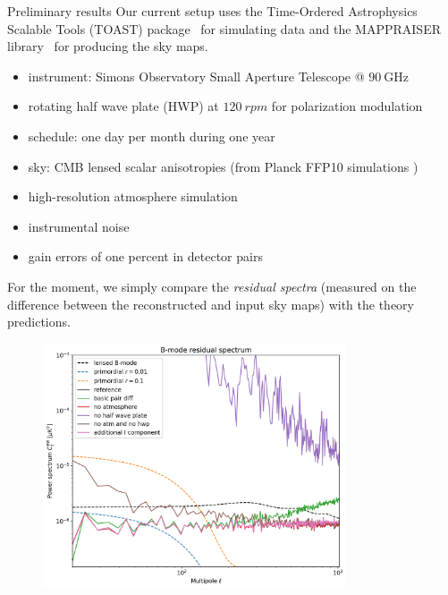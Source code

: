 \documentclass[final]{beamer}
\newlength{\colwidth}
\begin{document}
\begin{frame}[t]
\begin{columns}[t]
\begin{column}{\colwidth}
\begin{block}{Preliminary results}
        Our current setup uses the Time-Ordered Astrophysics Scalable Tools (TOAST) package~\cite{toast} for simulating data and the MAPPRAISER library~\cite{ElBouhargani:2021umq} for producing the sky maps.

        \begin{itemize}
          \item instrument: Simons Observatory Small Aperture Telescope @ $\qty[mode=text]{90}{\giga\hertz}$
          \item rotating half wave plate (HWP) at $\qty[mode=text]{120}{rpm}$ for polarization modulation
          \item schedule: one day per month during one year
          \item sky: CMB lensed scalar anisotropies (from Planck FFP10 simulations \cite{Planck:2018-iii})
          \item high-resolution atmosphere simulation
          \item instrumental noise
          \item gain errors of one percent in detector pairs
        \end{itemize}

        For the moment, we simply compare the \emph{residual spectra} (measured on the difference between the reconstructed and input sky maps) with the theory predictions.

        \begin{figure}
          \centering
          \includegraphics[width=0.8\textwidth]{figures/comparison.png}
        \end{figure}


\end{block}
\end{column}
\end{columns}
\end{frame}
\end{document}
